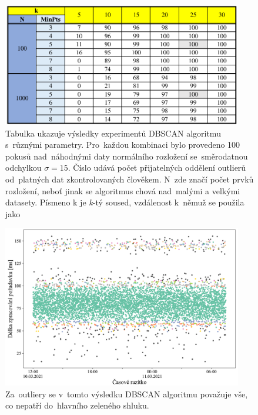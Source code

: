 \begin{figure}[hbt]
    \centering
    \includegraphics[width=0.935\textwidth]{obrazky/dbscan-params-results.pdf}
    \caption{Tabulka ukazuje výsledky experimentů DBSCAN algoritmu s~různými parametry. Pro~každou kombinaci bylo provedeno 100 pokusů nad~náhodnými daty normálního rozložení se~směrodatnou odchylkou \(\sigma = 15\). Číslo udává počet přijatelných oddělení outlierů od~platných dat zkontrolovaných člověkem. N~zde značí počet prvků rozložení, neboť jinak se algoritmus chová nad~malými a velkými datasety. Písmeno k je \emph{k}-tý soused, vzdálenost k~němuž se použila jako \textepsilon}
    \label{dbscan-params-table}
\end{figure}

\begin{figure}[!hbt]
    \centering
    \includegraphics[width=0.935\textwidth]{obrazky/dbscan-outlier-detection.pdf}
    \caption{Za~outliery se v~tomto výsledku DBSCAN algoritmu považuje vše, co nepatří do~hlavního zeleného shluku.}
    \label{dbscan-outlier-detection-img}
\end{figure}

